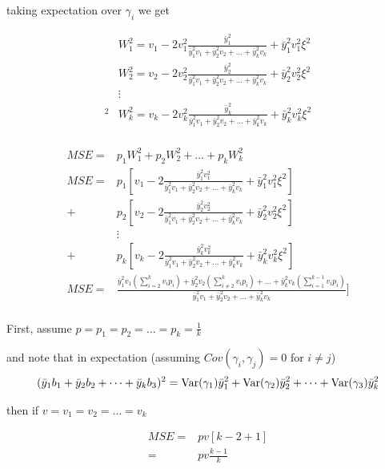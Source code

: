 taking expectation over $\gamma_i$ we get

\begin{align*}
		  &W_1^2=  v_1 - 2 v_1^2 \frac{\bar{y}_1^2 }{\bar{y}_1^2 v_1 + \bar{y}_2^2 v_2 + \ldots + \bar{y}_k^2 v_k} + \bar{y}_1^2 v_1^2 \xi^2 \\
		  &W_2^2=  v_2 - 2 v_2^2 \frac{\bar{y}_2^2 }{\bar{y}_1^2 v_1 + \bar{y}_2^2 v_2 + \ldots + \bar{y}_k^2 v_k} + \bar{y}_2^2 v_2^2 \xi^2 \\
		  & \vdots \\         ^2
		  &W_k^2=  v_k - 2 v_k^2 \frac{\bar{y}_k^2 }{\bar{y}_1^2 v_1 + \bar{y}_2^2 v_2 + \ldots + \bar{y}_k^2 v_k} + \bar{y}_k^2 v_k^2 \xi^2 \\
\end{align*}


\begin{align*}
	MSE = &p_1 W_1^2 + p_2 W_2^2 + \ldots + p_k W_k^2 \\
	MSE = &p_1[v_1 - 2 \frac{\bar{y}_1^2 v_1^2}{\bar{y}_1^2 v_1 + \bar{y}_2^2 v_2 + \ldots + \bar{y}_k^2 v_k} + \bar{y}_1^2 v_1^2 \xi^2] \\
	    + &p_2[v_2 - 2 \frac{\bar{y}_2^2 v_2^2}{\bar{y}_1^2 v_1 + \bar{y}_2^2 v_2 + \ldots + \bar{y}_k^2 v_k} + \bar{y}_2^2 v_2^2 \xi^2 ] \\ 
	      & \vdots \\
	    + &p_k [v_k -2 \frac{\bar{y}_k^2 v_k^2}{\bar{y}_1^2 v_1 + \bar{y}_2^2 v_2 + \ldots + \bar{y}_k^2 v_k} + \bar{y}_k^2 v_k^2 \xi^2] \\
	MSE = &\frac{\bar{y}_1^2 v_1 (\sum_{i=2}^k v_i p_i) + \bar{y}_2^2 v_2 (\sum_{i \neq2}^k v_i p_i)+ \ldots + \bar{y}_k^2 v_k (\sum_{i=1}^{k-1} v_i p_i)}{\bar{y}_1^2 v_1 + \bar{y}_2^2 v_2 + \ldots + \bar{y}_k^2 v_k} ] \\
\end{align*}

First, assume $p = p_1 = p_2 = \dots = p_k = \frac{1}{k}$
            
and note that in expectation (assuming $Cov(\gamma_i, \gamma_j) = 0$ for $i \neq j$)
\begin{align*}
	(\bar{y}_1 b_1 + \bar{y}_2 b_2 + \dots + \bar{y}_k b_3 )^2 &= \mathrm{Var}(\gamma_1) \bar{y}_1^2 + \mathrm{Var}(\gamma_2) \bar{y}_2^2 + \dots +\mathrm{Var}(\gamma_3) \bar{y}_k^2 \\
\end{align*}

then if $v = v_1 = v_2 = \dots = v_k$

\begin{align*}
	MSE = & p v  [k - 2 + 1] \\
	= &p v \frac{k-1}{k}
\end{align*} 
